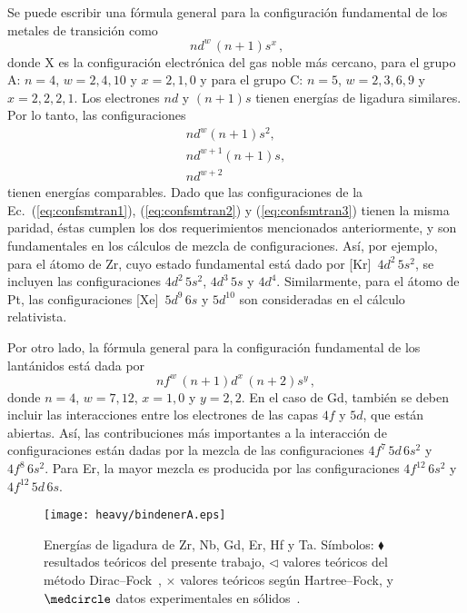 Se puede escribir una fórmula general para la configuración fundamental 
de los metales de transición como
\begin{equation}
[\text{X}]\,nd^w\,(n+1)s^x\,,
\end{equation}
donde X es la configuración electrónica del gas noble más cercano, para 
el grupo A: $n=4$, $w=2,4,10$ y $x=2,1,0$ y para el grupo C: $n=5$, 
$w=2,3,6,9$ y $x=2,2,2,1$. Los electrones $nd$ y $(n+1)s$ tienen 
energías de ligadura similares. Por lo tanto, las configuraciones 
\begin{gather}
nd^w(n+1)s^2,
\label{eq:confsmtran1} \\
nd^{w+1}(n+1)s,
\label{eq:confsmtran2} \\
nd^{w+2}
\label{eq:confsmtran3}
\end{gather}
tienen energías comparables. Dado que las configuraciones de la 
Ec.~(\ref{eq:confsmtran1}), (\ref{eq:confsmtran2}) y 
(\ref{eq:confsmtran3}) tienen la misma paridad, éstas cumplen los dos 
requerimientos mencionados anteriormente, y son fundamentales en los 
cálculos de mezcla de configuraciones. Así, por ejemplo, para el átomo 
de Zr, cuyo estado fundamental está dado por [Kr]~$4d^2\,5s^2$, se 
incluyen las configuraciones $4d^2\,5s^2$, $4d^3\,5s$ y $4d^4$. 
Similarmente, para el átomo de Pt, las configuraciones [Xe]~$5d^9\,6s$ y 
$5d^{10}$ son consideradas en el cálculo relativista.

Por otro lado, la fórmula general para la configuración fundamental de 
los lantánidos está dada por
\begin{equation}
nf^w\,(n+1)d^x\,(n+2)s^y\,,
\end{equation}
donde $n=4$, $w=7,12$, $x=1,0$ y $y=2,2$. En el caso de Gd, también 
se deben incluir las interacciones entre los electrones de las capas
$4f$ y $5d$, que están abiertas. Así, las contribuciones más 
importantes a la interacción de configuraciones están dadas por la 
mezcla de las configuraciones $4f^7\,5d\,6s^2$ y $4f^8\,6s^2$.
Para Er, la mayor mezcla es producida por las configuraciones 
$4f^{12}\,6s^2$ y $4f^{12}\,5d\,6s$.

\begin{figure}
\centering
\texttt{[image: heavy/bindenerA.eps]} 
\caption[Energías de ligadura de blancos relativistas]
{Energías de ligadura de Zr, Nb, Gd, Er, Hf y Ta. Símbolos: 
$\blacklozenge$ resultados teóricos del presente trabajo, 
$\triangleleft$ valores teóricos del método 
Dirac--Fock~\cite{Desclaux:73}, $\times$ valores teóricos según 
Hartree--Fock, y $\medcircle$ datos experimentales en 
sólidos~\cite{Williams:95}.}
\label{fig:bindenerA}
\end{figure}

